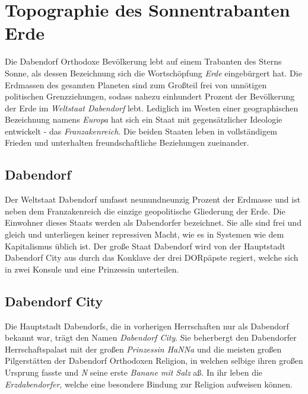 \section{{Topographie des Sonnentrabanten Erde}}
Die Dabendorf Orthodoxe Bevölkerung lebt auf einem Trabanten des Sterns Sonne, als dessen Bezeichnung sich die Wortschöpfung \textit{Erde} eingebürgert hat. Die Erdmassen des gesamten Planeten sind zum Großteil frei von unnötigen politischen Grenzziehungen, sodass nahezu einhundert Prozent der Bevölkerung der Erde im \textit{Weltstaat Dabendorf} lebt. Lediglich im Westen einer geographischen Bezeichnung namens \textit{Europa} hat sich ein Staat mit gegensätzlicher Ideologie entwickelt - das \textit{Franzakenreich}. Die beiden Staaten leben in vollständigem Frieden und unterhalten freundschaftliche Beziehungen zueinander.

\subsection{{Dabendorf}}
Der Weltstaat Dabendorf umfasst neunundneunzig Prozent der Erdmasse und ist neben dem Franzakenreich die einzige geopolitische Gliederung der Erde. Die Einwohner dieses Staats werden als Dabendorfer bezeichnet. Sie alle sind frei und gleich und unterliegen keiner repressiven Macht, wie es in Systemen wie dem Kapitalismus üblich ist. Der große Staat Dabendorf wird von der Hauptstadt Dabendorf City aus durch das Konklave der drei DORpäpste regiert, welche sich in zwei Konsule und eine Prinzessin unterteilen.

\subsection{{Dabendorf City}}
Die Hauptstadt Dabendorfs, die in vorherigen Herrschaften nur als Dabendorf bekannt war, trägt den Namen \textit{Dabendorf City}. Sie beherbergt den Dabendorfer Herrschaftspalast mit der großen \textit{Prinzessin HaNNa} und die meisten großen Pilgerstätten der Dabendorf Orthodoxen Religion, in welchen selbige ihren großen Ursprung fasste und \textit{N} seine erste \textit{Banane mit Salz} aß. In ihr leben die \textit{Erzdabendorfer}, welche eine besondere Bindung zur Religion aufweisen können.

